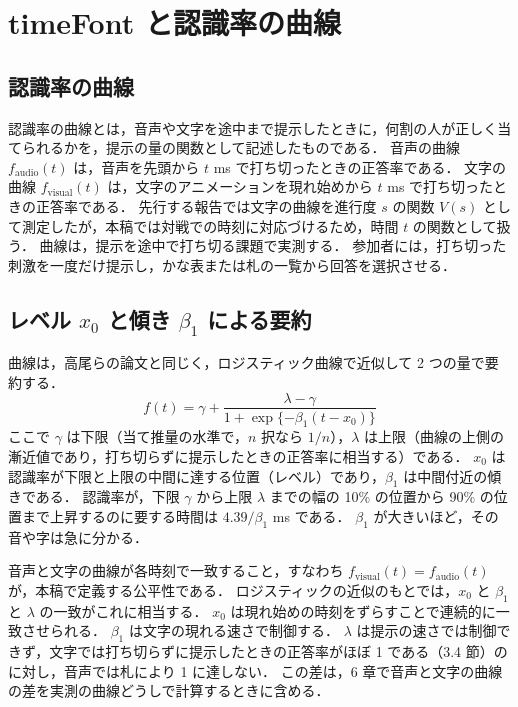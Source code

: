 \section{timeFont と認識率の曲線}

\subsection{認識率の曲線}

認識率の曲線とは，音声や文字を途中まで提示したときに，何割の人が正しく当てられるかを，提示の量の関数として記述したものである．
音声の曲線 $f_{\mathrm{audio}}(t)$ は，音声を先頭から $t$ ms で打ち切ったときの正答率である．
文字の曲線 $f_{\mathrm{visual}}(t)$ は，文字のアニメーションを現れ始めから $t$ ms で打ち切ったときの正答率である．
先行する報告\cite{maruyama2026wiss}では文字の曲線を進行度 $s$ の関数 $V(s)$ として測定したが，本稿では対戦での時刻に対応づけるため，時間 $t$ の関数として扱う．
曲線は，提示を途中で打ち切る課題で実測する．
参加者には，打ち切った刺激を一度だけ提示し，かな表または札の一覧から回答を選択させる．

\subsection{レベル $x_0$ と傾き $\beta_1$ による要約}

曲線は，高尾らの論文\cite{takao2026}と同じく，ロジスティック曲線で近似して 2 つの量で要約する．
\begin{equation}
f(t) = \gamma + \frac{\lambda - \gamma}{1 + \exp\{-\beta_1 (t - x_0)\}}
\label{eq:logistic}
\end{equation}
ここで $\gamma$ は下限（当て推量の水準で，$n$ 択なら $1/n$），$\lambda$ は上限（曲線の上側の漸近値であり，打ち切らずに提示したときの正答率に相当する）である．
$x_0$ は認識率が下限と上限の中間に達する位置（レベル）であり，$\beta_1$ は中間付近の傾きである．
認識率が，下限 $\gamma$ から上限 $\lambda$ までの幅の 10\% の位置から 90\% の位置まで上昇するのに要する時間は $4.39/\beta_1$ ms である．
$\beta_1$ が大きいほど，その音や字は急に分かる．

音声と文字の曲線が各時刻で一致すること，すなわち $f_{\mathrm{visual}}(t) = f_{\mathrm{audio}}(t)$ が，本稿で定義する公平性である．
ロジスティックの近似のもとでは，$x_0$ と $\beta_1$ と $\lambda$ の一致がこれに相当する．
$x_0$ は現れ始めの時刻をずらすことで連続的に一致させられる．
$\beta_1$ は文字の現れる速さで制御する．
$\lambda$ は提示の速さでは制御できず，文字では打ち切らずに提示したときの正答率がほぼ 1 である（3.4 節）のに対し，音声では札により 1 に達しない．
この差は，6 章で音声と文字の曲線の差を実測の曲線どうしで計算するときに含める．


